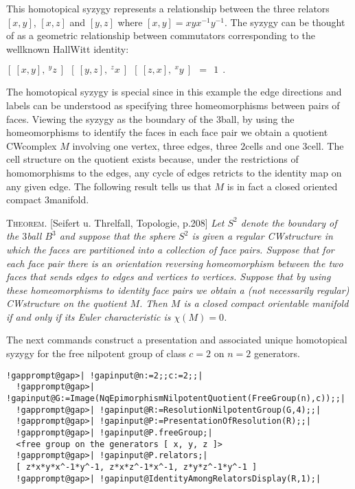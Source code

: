 \documentclass[a4paper,11pt]{report}
\begin{document}
{{\begin{Verbatim}[commandchars=!@|,fontsize=\small,frame=single,label=Example]
\end{Verbatim}
 

  

 This homotopical syzygy represents a relationship between the three relators $[x,y]$, $[x,z]$ and $[y,z]$ where $[x,y]=xyx^{-1}y^{-1}$. The syzygy can be thought of as a geometric relationship between commutators
corresponding to the well\texttt{}known
Hall\texttt{}Witt identity: 

$ [\ [x,y],\ {^yz}\ ]\ \ [\ [y,z],\ {^zx}\ ]\ \ [\ [z,x],\ {^xy}\ ]\ \ =\ \ 1\ \
.$ 

The homotopical syzygy is special since in this example the edge directions
and labels can be understood as specifying three homeomorphisms between pairs
of faces. Viewing the syzygy as the boundary of the $3$\texttt{}ball, by using the homeomorphisms to identify the faces in
each face pair we obtain a quotient CW\texttt{}complex $M$ involving one vertex, three edges, three $2$\texttt{}cells and one $3$\texttt{\symbol{45}}cell. The cell structure on the quotient exists because,
under the restrictions of homomorphisms to the edges, any cycle of edges
retricts to the identity map on any given edge. The following result tells us
that $M$ is in fact a closed oriented compact $3$\texttt{\symbol{45}}manifold. 

\textsc{Theorem.} [Seifert u. Threlfall, Topologie, p.208] \emph{Let $S^2$ denote the boundary of the $3$\texttt{}ball $B^3$ and suppose that the sphere $S^2$ is given a regular CW\texttt{}structure in which the faces are
partitioned into a collection of face pairs. Suppose that for each face pair
there is an orientation reversing homeomorphism between the two faces that
sends edges to edges and vertices to vertices. Suppose that by using these
homeomorphisms to identity face pairs we obtain a (not necessarily regular)
CW\texttt{\symbol{45}}structure on the quotient $M$. Then $M$ is a closed compact orientable manifold if and only if its Euler
characteristic is $\chi(M)=0$.} 

The next commands construct a presentation and associated unique homotopical
syzygy for the free nilpotent group of class $c=2$ on $n=2$ generators. 
\begin{Verbatim}[commandchars=!@|,fontsize=\small,frame=single,label=Example]
  !gapprompt@gap>| !gapinput@n:=2;;c:=2;;|
  !gapprompt@gap>| !gapinput@G:=Image(NqEpimorphismNilpotentQuotient(FreeGroup(n),c));;|
  !gapprompt@gap>| !gapinput@R:=ResolutionNilpotentGroup(G,4);;|
  !gapprompt@gap>| !gapinput@P:=PresentationOfResolution(R);;|
  !gapprompt@gap>| !gapinput@P.freeGroup;|
  <free group on the generators [ x, y, z ]>
  !gapprompt@gap>| !gapinput@P.relators;|
  [ z*x*y*x^-1*y^-1, z*x*z^-1*x^-1, z*y*z^-1*y^-1 ]
  !gapprompt@gap>| !gapinput@IdentityAmongRelatorsDisplay(R,1);|
  

\end{Verbatim}}}
\end{document}
